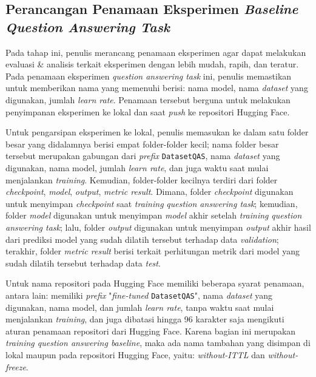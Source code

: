 \subsection{Perancangan Penamaan Eksperimen \emph{Baseline Question Answering Task}}
Pada tahap ini, penulis merancang penamaan eksperimen agar dapat melakukan evaluasi \& analisis terkait eksperimen dengan lebih mudah, rapih, dan teratur. Pada penamaan eksperimen \emph{question answering task} ini, penulis memastikan untuk memberikan nama yang memenuhi berisi: nama model, nama \emph{dataset} yang digunakan, jumlah \emph{learn rate}. Penamaan tersebut berguna untuk melakukan penyimpanan eksperimen ke lokal dan saat \emph{push} ke repositori Hugging Face. 

Untuk pengarsipan eksperimen ke lokal, penulis memasukan ke dalam satu folder besar yang didalamnya berisi empat folder-folder kecil; nama folder besar tersebut merupakan gabungan dari \emph{prefix} \texttt{DatasetQAS}, nama \emph{dataset} yang digunakan, nama model, jumlah \emph{learn rate}, dan juga waktu saat mulai menjalankan \emph{training}. Kemudian, folder-folder kecilnya terdiri dari folder \emph{checkpoint}, \emph{model}, \emph{output}, \emph{metric result}. Dimana, folder \emph{checkpoint} digunakan untuk menyimpan \emph{checkpoint} saat \emph{training} \emph{question answering task}; kemudian, folder \emph{model} digunakan untuk menyimpan \emph{model} akhir setelah \emph{training} \emph{question answering task}; lalu, folder \emph{output} digunakan untuk menyimpan \emph{output} akhir hasil dari prediksi model yang sudah dilatih tersebut terhadap data \emph{validation}; terakhir, folder \emph{metric result} berisi terkait perhitungan metrik dari model yang sudah dilatih tersebut terhadap data \emph{test}. 

Untuk nama repositori pada Hugging Face memiliki beberapa syarat penamaan, antara lain: memiliki \emph{prefix} "\emph{fine-tuned} \texttt{DatasetQAS}", nama \emph{dataset} yang digunakan, nama model, dan jumlah \emph{learn rate}, tanpa waktu saat mulai menjalankan \emph{training}, dan juga dibatasi hingga 96 karakter saja mengikuti aturan penamaan repositori dari Hugging Face. Karena bagian ini merupakan \emph{training question answering baseline}, maka ada nama tambahan yang disimpan di lokal maupun pada repositori Hugging Face, yaitu: \emph{without-ITTL} dan \emph{without-freeze}.

